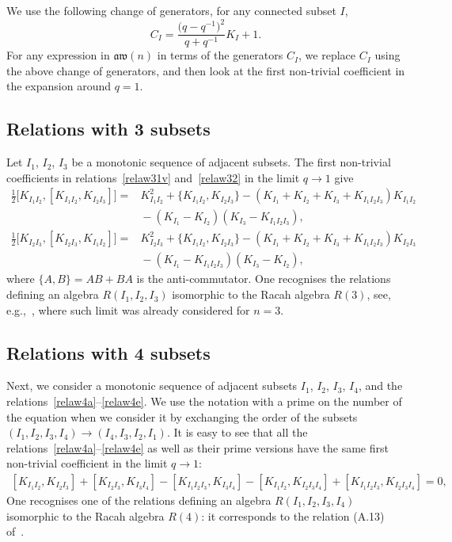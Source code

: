 \documentclass[10pt,a4paper]{amsart}
\numberwithin{equation}{section}
\theoremstyle{definition}
\newcommand{\aw}{\mathfrak{aw}(n)}
\begin{document}
We use the following change of generators, for any connected subset $I$,
\begin{equation*}
C_I = \frac{\big(q-q^{-1}\big)^2}{q+q^{-1}} K_I+1.
\end{equation*}
For any expression in $\aw$ in terms of the generators $C_I$, we replace $C_I$ using the above change of generators, and then look at the first non-trivial coefficient in the expansion around $q=1$.
\subsection{Relations with 3 subsets}
Let $I_1$, $I_2$, $I_3$ be a monotonic sequence of adjacent subsets.
The first non-trivial coefficients in relations~\eqref{relaw31v} and~\eqref{relaw32} in the limit $q\to1$ give
\begin{subequations}
\begin{align}
\label{eq:Rac1}
\frac{1}{2}\big[K_{I_1I_2}, [K_{I_1I_2},K_{I_2I_3}] \big] ={}& K_{I_1I_2}^2 + \{K_{I_1I_2},K_{I_2I_3}\} - (K_{I_1}+K_{I_2}+K_{I_3}+K_{I_1I_2I_3})K_{I_1I_2} \nonumber\\
&{}- (K_{I_1}-K_{I_2})(K_{I_3}-K_{I_1I_2I_3}) , \\
\label{eq:Rac2}
\frac{1}{2}\big[K_{I_2I_3}, [K_{I_2I_3},K_{I_1I_2}] \big] ={}& K_{I_2I_3}^2 + \{K_{I_1I_2},K_{I_2I_3}\} - (K_{I_1}+K_{I_2}+K_{I_3}+K_{I_1I_2I_3})K_{I_2I_3} \nonumber\\
&{}- (K_{I_1}-K_{I_1I_2I_3})(K_{I_3}-K_{I_2}) ,
\end{align}
\end{subequations}
where $\{A,B\}=AB+BA$ is the anti-commutator.
One recognises the relations defining an algebra $R(I_1,I_2,I_3)$ isomorphic to the Racah algebra $R(3)$, see, e.g.,~\cite{avatar}, where such limit was already considered for $n=3$.

\subsection{Relations with 4 subsets}
Next, we consider a monotonic sequence of adjacent subsets $I_1$, $I_2$, $I_3$, $I_4$, and the relations~\eqref{relaw4a}--\eqref{relaw4e}. We use the notation with a prime on the number of the equation
when we consider it by exchanging the order of the subsets $(I_1,I_2,I_3,I_4)\to(I_4,I_3,I_2,I_1)$.
It is easy to see that all the relations~\eqref{relaw4a}--\eqref{relaw4e} as well as their prime versions
have the same first non-trivial coefficient in the limit $q\to 1$:
\begin{gather}\label{eq:cub0}
 [K_{I_1I_2},K_{I_2I_3}]\! + \![K_{I_2I_3},K_{I_3I_4}]\! -\! [K_{I_1I_2I_3},K_{I_3I_4}]\! - \![K_{I_1I_2},K_{I_2I_3I_4}]\! + \![K_{I_1I_2I_3},K_{I_2I_3I_4}]\! = \!0,
\end{gather}
One recognises one of the relations defining an algebra $R(I_1,I_2,I_3,I_4)$ isomorphic to the Racah algebra $R(4)$:
it corresponds to the relation (A.13) of~\cite{CFR}.
\end{document}
